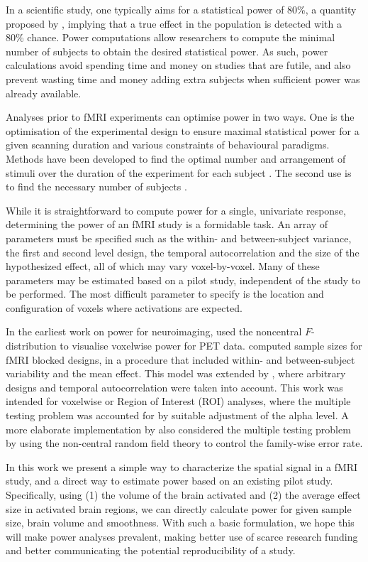 In a scientific study, one typically aims for a statistical power of 80\%, a quantity proposed by \citet{Cohen1988}, implying that a true effect in the population is detected with a 80\% chance.  Power computations allow researchers to compute the minimal number of subjects to obtain the desired statistical power.  As such, power calculations avoid spending time and money on studies that are futile, and also prevent wasting time and money adding extra subjects when sufficient power was already available.

Analyses prior to fMRI experiments can optimise power in two ways.  One is the optimisation of the experimental design to ensure maximal statistical power for a given scanning duration and various constraints of behavioural paradigms.  Methods have been developed to find the optimal number and arrangement of stimuli over the duration of the experiment for each subject \citep{Henson2007,Wager2003, Friston1999, Smith2007}.  The second use is to find the necessary number of subjects \citep{Desmond2002,Mumford2008}.

While it is straightforward to compute power for a single, univariate response, determining the power of an fMRI study is a formidable task.  An array of parameters must be specified such as the within- and between-subject variance, the first and second level design, the temporal autocorrelation and the size of the hypothesized effect, all of which may vary voxel-by-voxel.  Many of these parameters may be estimated based on a pilot study, independent of the study to be performed.  The most difficult parameter to specify is the location and configuration of voxels where activations are expected.

In the earliest work on power for neuroimaging, \citet{VanHorn1998} used the noncentral $F$-distribution to visualise voxelwise power for PET data.  \citet{Desmond2002} computed sample sizes for fMRI blocked designs, in a procedure that included within- and between-subject variability and the mean effect.  This model was extended by \citet{Mumford2008}, where arbitrary designs and temporal autocorrelation were taken into account.  This work was intended for voxelwise or Region of Interest (ROI) analyses, where the multiple testing problem was accounted for by suitable adjustment of the alpha level. A more elaborate implementation by \citet{Hayasaka2007} also considered the multiple testing problem by using the non-central random field theory to control the family-wise error rate.

In this work we present a simple way to characterize the spatial signal in a fMRI study, and a direct way to estimate power based on an existing pilot study. Specifically, using (1) the volume of the brain activated and (2) the average effect size in activated brain regions, we can directly calculate power for given sample size, brain volume and smoothness. With such a basic formulation, we hope this will make power analyses prevalent, making better use of scarce research funding and better communicating the potential reproducibility of a study.

